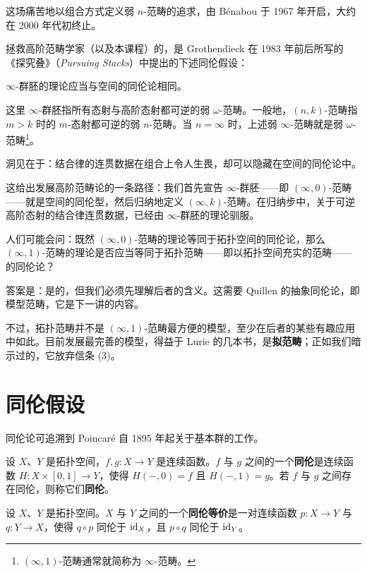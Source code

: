 \nitem\label{L1-3.7} 这场痛苦地以组合方式定义弱 $n$-范畴的追求，由 B\'enabou 于 1967 年开启，大约在 2000 年代初终止。

\nitem\label{L1-3.8} 拯救高阶范畴学家（以及本课程）的，是 Grothendieck 在 1983 年前后所写的《探究叠》（\emph{Pursuing Stacks}）中提出的下述同伦假设：

\begin{slogan}\label{L1-3.9}\centering\par
$\infty$-群胚的理论应当与空间的同伦论相同。
\end{slogan}

\nitem\label{L1-3.10} 这里 $\infty$-群胚指所有态射与高阶态射都可逆的弱 $\omega$-范畴。一般地，$(n,k)$-范畴指 $m>k$ 时的 $m$-态射都可逆的弱 $n$-范畴。当 $n=\infty$ 时，上述弱 $\infty$-范畴就是弱 $\omega$-范畴\footnote{$(\infty,1)$-范畴通常就简称为 $\infty$-范畴。}。

洞见在于：结合律的连贯数据在组合上令人生畏，却可以隐藏在空间的同伦论中。

这给出发展高阶范畴论的一条路径：我们首先宣告 $\infty$-群胚——即 $(\infty,0)$-范畴——就是空间的同伦型，然后归纳地定义 $(\infty,k)$-范畴。在归纳步中，关于可逆高阶态射的结合律连贯数据，已经由 $\infty$-群胚的理论驯服。

\nitem\label{L1-3.11} 人们可能会问：既然 $(\infty,0)$-范畴的理论等同于拓扑空间的同伦论，那么 $(\infty,1)$-范畴的理论是否应当等同于拓扑范畴——即以拓扑空间充实的范畴——的同伦论？

答案是：是的，但我们必须先理解后者的含义。这需要 Quillen 的抽象同伦论，即模型范畴，它是下一讲的内容。

不过，拓扑范畴并不是 $(\infty,1)$-范畴最方便的模型，至少在后者的某些有趣应用中如此。目前发展最完善的模型，得益于 Lurie 的几本书，是\textbf{拟范畴}；正如我们暗示过的，它放弃信条 (3)。

\section{同伦假设}

\nitem\label{L1-4.1} 同伦论可追溯到 Poincar\'e 自 1895 年起关于基本群的工作。

\begin{definition}\label{L1-4.2}
设 $X$、$Y$ 是拓扑空间，$f,g\colon X\to Y$ 是连续函数。$f$ 与 $g$ 之间的一个\textbf{同伦}是连续函数 $H\colon X\times[0,1]\to Y$，使得 $H(-,0)=f$ 且 $H(-,1)=g$。若 $f$ 与 $g$ 之间存在同伦，则称它们\textbf{同伦}。
\end{definition}

设 $X$、$Y$ 是拓扑空间。$X$ 与 $Y$ 之间的一个\textbf{同伦等价}是一对连续函数 $p\colon X\to Y$ 与 $q\colon Y\to X$，使得 $q\circ p$ 同伦于 $\operatorname{id}_X$，且 $p\circ q$ 同伦于 $\operatorname{id}_Y$。

